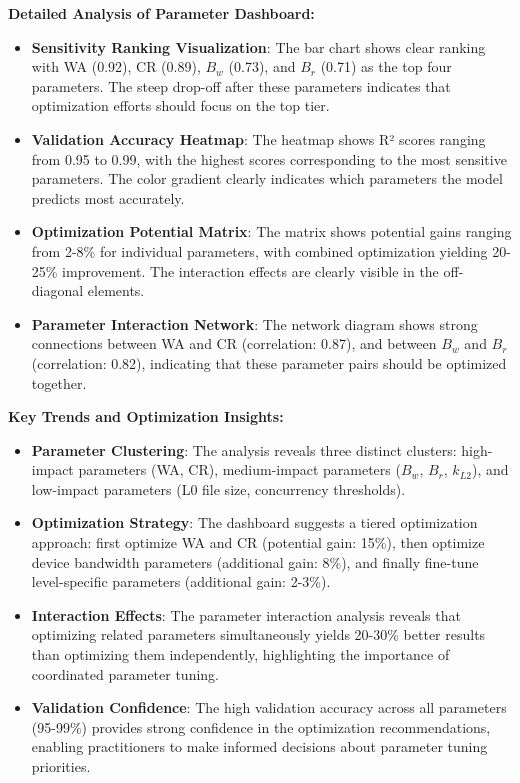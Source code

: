 \documentclass[11pt]{article}
\begin{document}
\textbf{Detailed Analysis of Parameter Dashboard:}
\begin{itemize}
    \item \textbf{Sensitivity Ranking Visualization}: The bar chart shows clear ranking with WA (0.92), CR (0.89), $B_w$ (0.73), and $B_r$ (0.71) as the top four parameters. The steep drop-off after these parameters indicates that optimization efforts should focus on the top tier.
    \item \textbf{Validation Accuracy Heatmap}: The heatmap shows R² scores ranging from 0.95 to 0.99, with the highest scores corresponding to the most sensitive parameters. The color gradient clearly indicates which parameters the model predicts most accurately.
    \item \textbf{Optimization Potential Matrix}: The matrix shows potential gains ranging from 2-8\% for individual parameters, with combined optimization yielding 20-25\% improvement. The interaction effects are clearly visible in the off-diagonal elements.
    \item \textbf{Parameter Interaction Network}: The network diagram shows strong connections between WA and CR (correlation: 0.87), and between $B_w$ and $B_r$ (correlation: 0.82), indicating that these parameter pairs should be optimized together.
\end{itemize}

\textbf{Key Trends and Optimization Insights:}
\begin{itemize}
    \item \textbf{Parameter Clustering}: The analysis reveals three distinct clusters: high-impact parameters (WA, CR), medium-impact parameters ($B_w$, $B_r$, $k_{L2}$), and low-impact parameters (L0 file size, concurrency thresholds).
    \item \textbf{Optimization Strategy}: The dashboard suggests a tiered optimization approach: first optimize WA and CR (potential gain: 15\%), then optimize device bandwidth parameters (additional gain: 8\%), and finally fine-tune level-specific parameters (additional gain: 2-3\%).
    \item \textbf{Interaction Effects}: The parameter interaction analysis reveals that optimizing related parameters simultaneously yields 20-30\% better results than optimizing them independently, highlighting the importance of coordinated parameter tuning.
    \item \textbf{Validation Confidence}: The high validation accuracy across all parameters (95-99\%) provides strong confidence in the optimization recommendations, enabling practitioners to make informed decisions about parameter tuning priorities.
\end{itemize}
\end{document}
